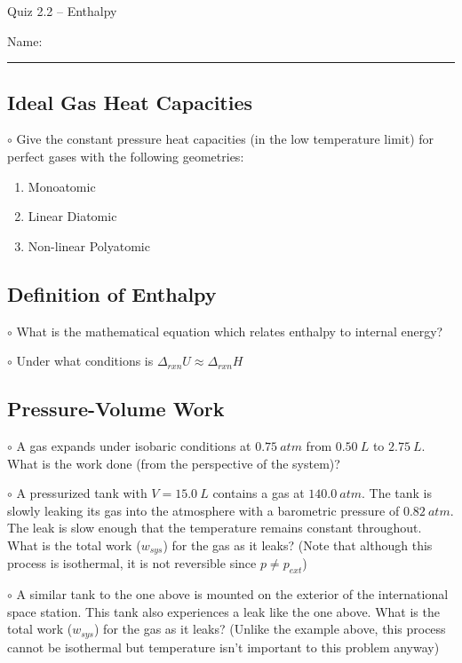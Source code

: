 \documentclass[11pt, letterpaper]{memoir}
\begin{document}
	\begin{center}
		{\large Quiz 2.2 --	Enthalpy}
	\end{center}
	{\large Name: \rule[-1mm]{4in}{.1pt} 

\subsection*{Ideal Gas Heat Capacities}
\noindent$\circ$ Give the constant pressure heat capacities (in the low temperature limit) for perfect gases with the following geometries:
\begin{enumerate}
	\item Monoatomic
	
	\vspace{1em}
	\item Linear Diatomic
	
	\vspace{1em}
	\item Non-linear Polyatomic	
\end{enumerate}

\vspace{1em}
\subsection*{Definition of Enthalpy}
$\circ$ What is the mathematical equation which relates enthalpy to internal energy?

\vspace{3em}
\noindent$\circ$ Under what conditions is $\Delta_{rxn}U\approx \Delta_{rxn}H$

\vspace{2em}
\subsection*{Pressure-Volume Work}
$\circ$ A gas expands under isobaric conditions at $0.75~atm$ from $0.50~L$ to $2.75~L$. What is the work done (from the perspective of the system)?

\vspace{3em}
\noindent $\circ$ A pressurized tank with $V=15.0~L$ contains a gas at $140.0~atm$. The tank is slowly leaking its gas into the atmosphere with a barometric pressure of $0.82~atm$. The leak is slow enough that the temperature remains constant throughout. What is the total work ($w_{sys}$) for the gas as it leaks? (Note that although this process is isothermal, it is not reversible since $p\neq p_{ext}$)

\vspace{4em}
\noindent $\circ$ A similar tank to the one above is mounted on the exterior of the international space station. This tank also experiences a leak like the one above. What is the total work ($w_{sys}$) for the gas as it leaks? (Unlike the example above, this process cannot be isothermal but temperature isn't important to this problem anyway)
\newpage
\pagestyle{empty}
\addtocounter{page}{-1}
}
\end{document}
